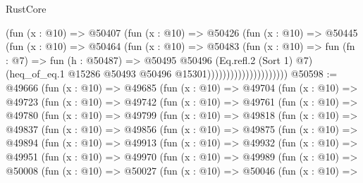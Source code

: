 \begin{lexlean}{RustCore}
\begin{coremodule}
                                (fun (x : @10) =>
                                @50407
                                  (fun (x : @10) =>
                                  @50426
                                    (fun (x : @10) =>
                                    @50445
                                      (fun (x : @10) =>
                                      @50464
                                        (fun (x : @10) =>
                                        @50483
                                          (fun (x : @10) =>
                                          fun (fn : @7) =>
                                          fun (h : @50487) =>
                                          @50495
                                            @50496
                                            (Eq.refl.{2} (Sort 1) @7)
                                            (heq_of_eq.{1}
                                              @15286
                                              @50493
                                              @50496
                                              @15301)))))))))))))))))))))
@50598 := @49666
    (fun (x : @10) =>
    @49685
      (fun (x : @10) =>
      @49704
        (fun (x : @10) =>
        @49723
          (fun (x : @10) =>
          @49742
            (fun (x : @10) =>
            @49761
              (fun (x : @10) =>
              @49780
                (fun (x : @10) =>
                @49799
                  (fun (x : @10) =>
                  @49818
                    (fun (x : @10) =>
                    @49837
                      (fun (x : @10) =>
                      @49856
                        (fun (x : @10) =>
                        @49875
                          (fun (x : @10) =>
                          @49894
                            (fun (x : @10) =>
                            @49913
                              (fun (x : @10) =>
                              @49932
                                (fun (x : @10) =>
                                @49951
                                  (fun (x : @10) =>
                                  @49970
                                    (fun (x : @10) =>
                                    @49989
                                      (fun (x : @10) =>
                                      @50008
                                        (fun (x : @10) =>
                                        @50027
                                          (fun (x : @10) =>
                                          @50046
                                            (fun (x : @10) =>

\end{coremodule}
\end{lexlean}
